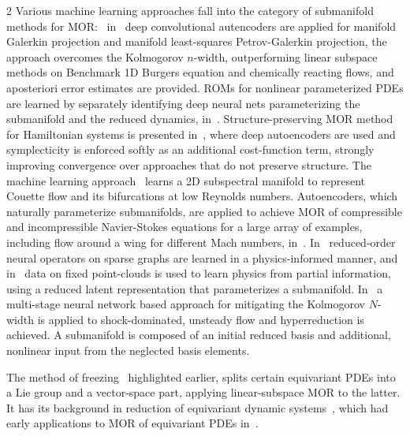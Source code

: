 \documentclass{article}
\begin{document}
\begin{multicols}{2}
Various machine learning approaches fall into the category of submanifold methods for MOR:\ %
in~\cite{Lee2020} deep convolutional autencoders are applied for manifold Galerkin projection and manifold least-squares Petrov-Galerkin projection, the approach overcomes the Kolmogorov $n$-width, outperforming linear subspace methods on Benchmark 1D Burgers equation and chemically reacting flows, and aposteriori error estimates are provided. ROMs for nonlinear parameterized PDEs are learned by separately identifying deep neural nets parameterizing the submanifold and the reduced dynamics, in~\cite{Fresca2021}. Structure-preserving MOR method for Hamiltonian systems is presented in~\cite{Buchfink2023c}, where deep autoencoders are used and symplecticity is enforced softly as an additional cost-function term, strongly improving convergence over approaches that do not preserve structure. 
The machine learning approach~\cite{Kaszs2022} learns a 2D subspectral manifold to represent Couette flow and its bifurcations at low Reynolds numbers. Autoencoders, which naturally parameterize submanifolds, are applied to achieve MOR of compressible and incompressible Navier-Stokes equations for a large array of examples, including flow around a wing for different Mach numbers, in~\cite{Romor2025}. In~\cite{Viswanath2025} reduced-order neural operators on sparse graphs are learned in a physics-informed manner, and in~\cite{Steeven2024} data on fixed point-clouds is used to learn physics from partial information, using a reduced latent representation that parameterizes a submanifold. In~\cite{Barnett2023} a multi-stage neural network based approach for mitigating the Kolmogorov $N$-width is applied to shock-dominated, unsteady flow and hyperreduction is achieved. A submanifold is composed of an initial reduced basis and additional, nonlinear input from the neglected basis elements.


The method of freezing~\cite{Ohlberger2016} highlighted earlier, splits certain equivariant PDEs into a Lie group and a vector-space part, applying linear-subspace MOR to the latter. It has its background in reduction of equivariant dynamic systems~\cite{Blankenstein2001,Cendra2001,Rowley2003}, which had early applications to MOR of equivariant PDEs in~\cite{Rowley2000,Beyn2004}.%


\end{multicols}
\end{document}
